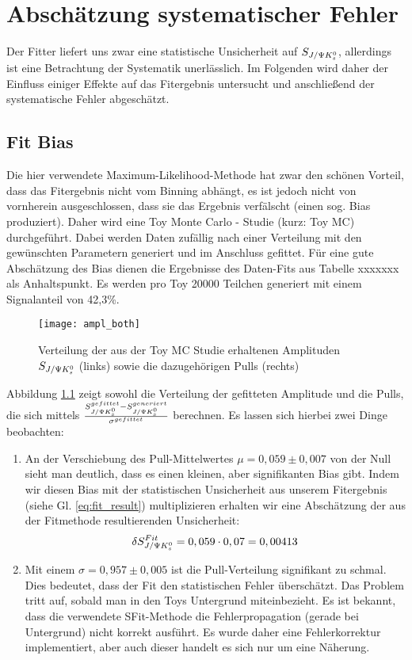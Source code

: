 \chapter{Abschätzung systematischer Fehler}
Der Fitter liefert uns zwar eine statistische Unsicherheit auf $S_{J/\Psi K_s^0}$, allerdings ist eine Betrachtung der Systematik unerlässlich. Im Folgenden wird daher der Einfluss einiger Effekte auf das Fitergebnis untersucht und anschließend der systematische Fehler abgeschätzt.

\section{Fit Bias} \label{kap:fit_bias}
Die hier verwendete Maximum-Likelihood-Methode hat zwar den schönen Vorteil, dass das Fitergebnis nicht vom Binning abhängt, es ist jedoch nicht von vornherein ausgeschlossen, dass sie das Ergebnis verfälscht (einen sog. Bias produziert). Daher wird eine Toy Monte Carlo - Studie (kurz: Toy MC) durchgeführt. Dabei werden Daten zufällig nach einer Verteilung mit den gewünschten Parametern generiert und im Anschluss gefittet. Für eine gute Abschätzung des Bias dienen die Ergebnisse des Daten-Fits aus Tabelle xxxxxxx als Anhaltspunkt. Es werden pro Toy 20000 Teilchen generiert mit einem Signalanteil von 42,3\%.

\begin{figure}[hptb]
\centering
\texttt{[image: ampl\_both]}
\caption{Verteilung der aus der Toy MC Studie erhaltenen Amplituden $S_{J/\Psi K_s^0}$ (links) sowie die dazugehörigen Pulls (rechts)}
\label{fig:fit_bias}
\end{figure}

Abbildung \ref{fig:fit_bias} zeigt sowohl die Verteilung der gefitteten Amplitude und die Pulls, die sich mittels $\frac{S_{J/\Psi K_s^0}^{gefittet} - S_{J/\Psi K_s^0}^{generiert}}{\sigma^{gefittet}}$ berechnen. Es lassen sich hierbei zwei Dinge beobachten:
\begin{enumerate}
    \item An der Verschiebung des Pull-Mittelwertes $\mu = 0,059 \pm 0,007$ von der Null sieht man deutlich, dass es einen kleinen, aber signifikanten Bias gibt. Indem wir diesen Bias mit der statistischen Unsicherheit aus unserem Fitergebnis (siehe Gl. \ref{eq:fit_result}) multiplizieren erhalten wir eine Abschätzung der aus der Fitmethode resultierenden Unsicherheit:
        \begin{align}
        \delta S_{J/\Psi K_s^0}^{Fit} = 0,059 \cdot 0,07 = 0,00413
        \end{align}

    \item Mit einem $\sigma = 0,957 \pm 0,005$ ist die Pull-Verteilung signifikant zu schmal. Dies bedeutet, dass der Fit den statistischen Fehler überschätzt. Das Problem tritt auf, sobald man in den Toys Untergrund miteinbezieht. Es ist bekannt, dass die verwendete SFit-Methode die Fehlerpropagation (gerade bei Untergrund) nicht korrekt ausführt. Es wurde daher eine Fehlerkorrektur implementiert, aber auch dieser handelt es sich nur um eine Näherung.
\end{enumerate}


